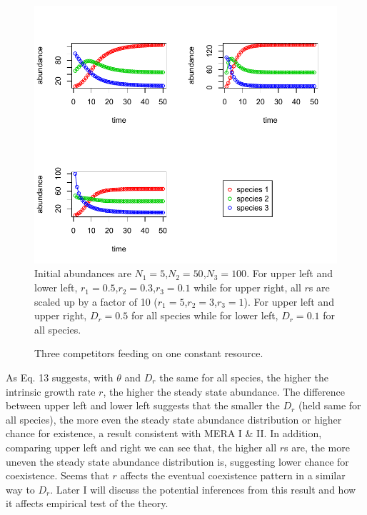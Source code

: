 \documentclass[12pt]{article}
\begin{document}
\begin{figure}
\caption{Three competitors feeding on one constant resource.}
\includegraphics[width=\textwidth]{integrated_multi_competitors.pdf}
Initial abundances are $N_1=5$,$N_2=50$,$N_3=100$. For upper left and lower left, $r_1=0.5$,$r_2=0.3$,$r_3=0.1$ while for upper right, all $r$s are scaled up by a factor of 10 ($r_1=5$,$r_2=3$,$r_3=1$). For upper left and upper right, $D_r=0.5$ for all species while for lower left, $D_r=0.1$ for all species.
\end{figure}

As Eq. 13 suggests, with $\theta$ and $D_r$ the same for all species, the higher the intrinsic growth rate $r$, the higher the steady state abundance. The difference between upper left and lower left suggests that the smaller the $D_r$ (held same for all species), the more even the steady state abundance distribution or higher chance for existence, a result consistent with MERA I \& II. In addition, comparing upper left and right we can see that, the higher all $r$s are, the more uneven the steady state abundance distribution is, suggesting lower chance for coexistence. Seems that $r$ affects the eventual coexistence pattern in a similar way to $D_r$. Later I will discuss the potential inferences  from this result and how it affects empirical test of the theory.
\end{document}
